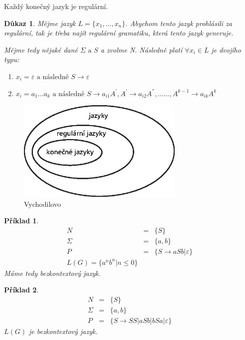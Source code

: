 \documentclass[10pt, a4paper, titlepage]{article}
\theoremstyle{note}
\newtheorem{dukaz}{\textbf{Důkaz}}
\newtheorem{priklad}{\textbf{Příklad}}
\begin{document}
Každý konečný jazyk je regulární.
\begin{dukaz}
Mějme jazyk $L = \lbrace x_{1},\ldots, x_{n} \rbrace$. Abychom tento jazyk prohlásili za regulární, tak je třeba najít regulární gramatiku,
která tento jazyk generuje.

Mějme tedy nějaké dané $\Sigma \text{ a } S$ a zvolme \emph{N}. Následně platí $\forall x_{i} \in L$ je dvojího typu:

\begin{enumerate}
\item
$x_{i} = \varepsilon \text{ a následně } S \rightarrow \varepsilon$

\item
$x_{i} = a_{1}\ldots a_{k} \text{ a následně } S \rightarrow a_{i1}A^{'}, A^{'} \rightarrow a_{i2}A^{''},\ldots\ldots, A^{k-1} \rightarrow a_{ik}A^{k}$
\end{enumerate}
\vspace{0px}
\end{dukaz}

\begin{figure}[ht]
\centering\includegraphics[width=8cm]{vajicko-1.eps}
\caption{Vychodilovo }\label{obr-2}
\end{figure}

\begin{priklad}
\begin{eqnarray*}
N &=& \lbrace S \rbrace \\
\Sigma &=& \lbrace a, b \rbrace \\
P &=& \lbrace S \rightarrow aSb | \varepsilon \rbrace \\
L(G) = \lbrace a^{n}b^{n} | n \leq 0 \rbrace
\end{eqnarray*}
Máme tedy \emph{bezkontextový} jazyk.
\end{priklad}

\begin{priklad}
\begin{eqnarray*}
N &=& \lbrace S \rbrace \\
\Sigma &=& \lbrace a, b \rbrace \\
P &=& \lbrace S \rightarrow SS|aSb|bSa| \varepsilon \rbrace
\end{eqnarray*}
$L(G)$ je \emph{bezkontextový} jazyk.
\end{priklad}
\end{document}
